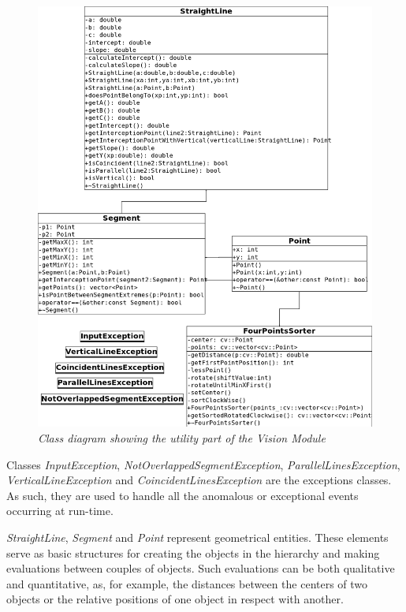 		\begin{figure}[h]
		  \begin{center} 
		    	
		       \includegraphics[width=\textwidth*\real{0.81}]{images/appendix/utility.png}
		    
		  \end{center} 
		  \caption{\textit{Class diagram showing the utility part of the Vision Module}}  
		  \label{fig:impl_utility}
	 	\end{figure}
		
		Classes \emph{InputException}, \emph{NotOverlappedSegmentException}, \emph{ParallelLinesException}, \emph{VerticalLineException} and \emph{CoincidentLinesException} are the exceptions classes. 
		As such, they are used to handle all the anomalous or exceptional events occurring at run-time.	
	
		\emph{StraightLine}, \emph{Segment} and \emph{Point} represent geometrical entities. These elements serve as basic structures for creating the objects in the hierarchy and making evaluations between couples of objects.
		Such evaluations can be both qualitative and quantitative, as, for example, the distances between the centers of two objects or the relative positions of one object in respect with another.
		
